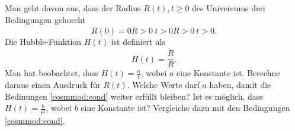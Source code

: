 \begin{Exercise}[label = cosmmod, origin = {STEP 2001, Paper 1}, title = {Hubbles  "Konstante"}, difficulty = 2]
	Man geht davon aus, dass der Radius $R\left(t\right), t\geq 0$ des Universums drei Bedingungen gehorcht
	\begin{subequations}\label{cosmmod:cond}
		\begin{equation}\label{cosmmod:bb}
			R\left(0\right) = 0
		\end{equation}
		\begin{equation}\label{cosmmod:rd}
			\dot{R} > 0 ~t>0
		\end{equation}
		\begin{equation}\label{cosmmod:rdd}
			\ddot{R} > 0 ~t>0.
		\end{equation}
	\end{subequations}
	Die Hubble-Funktion $H\left(t\right)$ ist definiert als
	\begin{equation}
		H\left(t\right) = \frac{\dot{R}}{R}.
	\end{equation}
	\Question Man hat beobachtet, dass $H\left(t\right)= \frac{a}{t}$, wobei $a$ eine Konstante ist. Berechne daraus einen Ausdruck für $R\left(t\right)$. Welche Werte darf $a$ haben, damit die Bedinungen \eqref{cosmmod:cond} weiter erfüllt bleiben?
	\Question Ist es möglich, dass $H\left(t\right) = \frac{b}{t^2}$, wobei $b$ eine Konstante ist? Vergleiche dazu mit den Bedingungen \eqref{cosmmod:cond}.
\end{Exercise}
